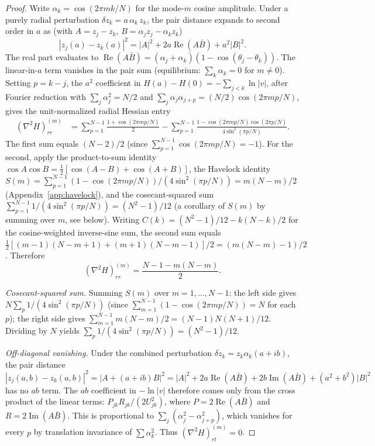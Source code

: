 \begin{proof}
Write $\alpha_k = \cos(2\pi m k / N)$ for the mode-$m$ cosine
amplitude. Under a purely radial perturbation
$\delta z_k = a\,\alpha_k\,z_k$, the pair distance expands to
second order in $a$ as (with $A = z_j - z_k$,
$B = \alpha_j z_j - \alpha_k z_k$)
\[
  |z_j(a) - z_k(a)|^2
   = |A|^2 + 2a\operatorname{Re}(A\bar B) + a^2|B|^2.
\]
The real part evaluates to
$\operatorname{Re}(A\bar B) = (\alpha_j + \alpha_k)(1 - \cos(\theta_j - \theta_k))$.
The linear-in-$a$ term vanishes in the pair sum (equilibrium:
$\sum_k \alpha_k = 0$ for $m \ne 0$). Setting $p = k - j$, the
$a^2$ coefficient in $H(a) - H(0) = -\sum_{j<k}\ln|v|$, after
Fourier reduction with
$\sum_j \alpha_j^2 = N/2$ and
$\sum_j \alpha_j\alpha_{j+p} = (N/2)\cos(2\pi mp/N)$, gives the
unit-normalized radial Hessian entry
\begin{align*}
  (\nabla^2 H)_{rr}^{(m)}
   &= \sum_{p=1}^{N-1} \frac{1 + \cos(2\pi mp/N)}{2}
      - \sum_{p=1}^{N-1}
        \frac{1 - \cos(2\pi mp/N)\cos(2\pi p/N)}{4\sin^2(\pi p/N)}.
\end{align*}
The first sum equals $(N{-}2)/2$ (since
$\sum_{p=1}^{N-1}\cos(2\pi mp/N) = -1$). For the second, apply
the product-to-sum identity $\cos A\cos B = \tfrac12[\cos(A{-}B) +
\cos(A{+}B)]$, the Havelock identity
$S(m) = \sum_{p=1}^{N-1}(1 - \cos(2\pi mp/N))/(4\sin^2(\pi p/N))
= m(N{-}m)/2$ (Appendix~\ref{app:havelock}), and the
cosecant-squared sum
$\sum_{p=1}^{N-1}1/(4\sin^2(\pi p/N)) = (N^2 - 1)/12$
(a corollary of $S(m)$ by summing over $m$, see below).
Writing $C(k) = (N^2{-}1)/12 - k(N{-}k)/2$ for the cosine-weighted
inverse-sine sum, the second sum equals
$\tfrac12[(m{-}1)(N{-}m{+}1) + (m{+}1)(N{-}m{-}1)]/2
= (m(N{-}m) - 1)/2$.
Therefore
\begin{equation}\label{eq:rr-unshifted-paper}
  (\nabla^2 H)_{rr}^{(m)} = \frac{N - 1 - m(N{-}m)}{2}.
\end{equation}

\emph{Cosecant-squared sum.}
Summing $S(m)$ over $m = 1, \ldots, N{-}1$: the left side gives
$N \sum_{p} 1/(4\sin^2(\pi p/N))$ (since
$\sum_{m=1}^{N-1}(1 - \cos(2\pi mp/N)) = N$ for each~$p$);
the right side gives $\sum_{m=1}^{N-1}m(N{-}m)/2 = (N{-}1)N(N{+}1)/12$.
Dividing by $N$ yields $\sum_p 1/(4\sin^2(\pi p/N)) = (N^2 - 1)/12$.

\emph{Off-diagonal vanishing.}
Under the combined perturbation $\delta z_k = z_k\alpha_k(a + ib)$,
the pair distance $|z_j(a,b) - z_k(a,b)|^2 = |A + (a{+}ib)B|^2
= |A|^2 + 2a\operatorname{Re}(A\bar B) + 2b\operatorname{Im}(A\bar B) + (a^2 + b^2)|B|^2$
has no $ab$ term. The $ab$ coefficient in $-\ln|v|$ therefore comes
only from the cross product of the linear terms:
$P_{jk}R_{jk}/(2U_{jk}^2)$, where
$P = 2\operatorname{Re}(A\bar B)$ and
$R = 2\operatorname{Im}(A\bar B)$. This is proportional to
$\sum_j(\alpha_j^2 - \alpha_{j+p}^2)$, which vanishes for every $p$
by translation invariance of $\sum\alpha_k^2$. Thus
$(\nabla^2 H)_{rt}^{(m)} = 0$.


\end{proof}
